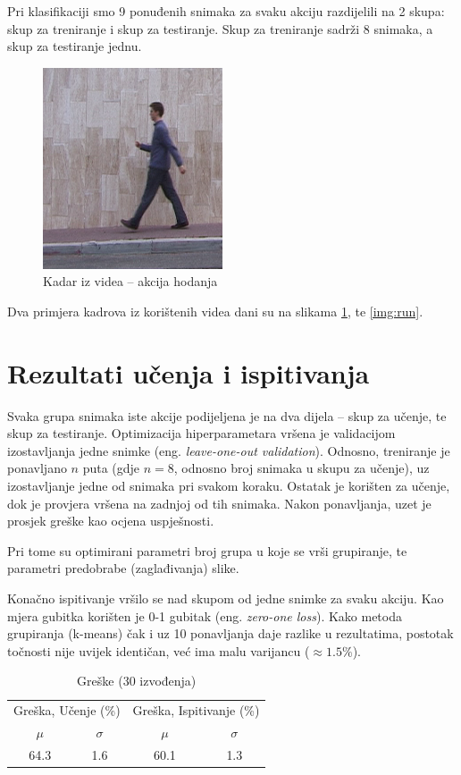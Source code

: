 \documentclass[times, utf8, diplomski]{fer}
\newcommand{\eng}[1]{(eng. \textit{#1})}
\begin{document}
Pri klasifikaciji smo 9 ponuđenih snimaka za svaku akciju razdijelili na 2 skupa: skup za treniranje i skup za testiranje. Skup za treniranje sadrži 8 snimaka, a skup za testiranje jednu.

\begin{figure}[ht!]
\centering
\includegraphics[scale=0.7]{walking.png}
\caption{Kadar iz videa -- akcija hodanja}
\label{img:walk}
\end{figure}

Dva primjera kadrova iz korištenih videa dani su na slikama \ref{img:walk}, te \ref{img:run}.

\section{Rezultati učenja i ispitivanja}

Svaka grupa snimaka iste akcije podijeljena je na dva dijela -- skup za učenje, te skup za testiranje. Optimizacija hiperparametara vršena je validacijom izostavljanja jedne snimke \eng{leave-one-out validation}. Odnosno, treniranje je ponavljano $n$ puta (gdje $n = 8$, odnosno broj snimaka u skupu za učenje), uz izostavljanje jedne od snimaka pri svakom koraku. Ostatak je korišten za učenje, dok je provjera vršena na zadnjoj od tih snimaka. Nakon ponavljanja, uzet je prosjek greške kao ocjena uspješnosti.

Pri tome su optimirani parametri broj grupa u koje se vrši grupiranje, te parametri predobrabe (zaglađivanja) slike.

Konačno ispitivanje vršilo se nad skupom od jedne snimke za svaku akciju. Kao mjera gubitka korišten je 0-1 gubitak \eng{zero-one loss}. Kako metoda grupiranja (k-means) čak i uz 10 ponavljanja daje razlike u rezultatima, postotak točnosti nije uvijek identičan, već ima malu varijancu ($\approx 1.5\%$).

\begin{table}
\centering
\begin{tabular}{c c | c c}
\toprule
\multicolumn{2}{c|}{Greška, Učenje (\%)} & \multicolumn{2}{|c}{Greška, Ispitivanje (\%)}\\
\cmidrule(r){1-2} \cmidrule(l){3-4}
$\mu$ & $\sigma$ & $\mu$ & $\sigma$ \\
\midrule
64.3 & 1.6 & 60.1 & 1.3 \\
\bottomrule
\end{tabular}
\caption{Greške (30 izvođenja)}
\label{tbl:errs}
\end{table}
\end{document}
